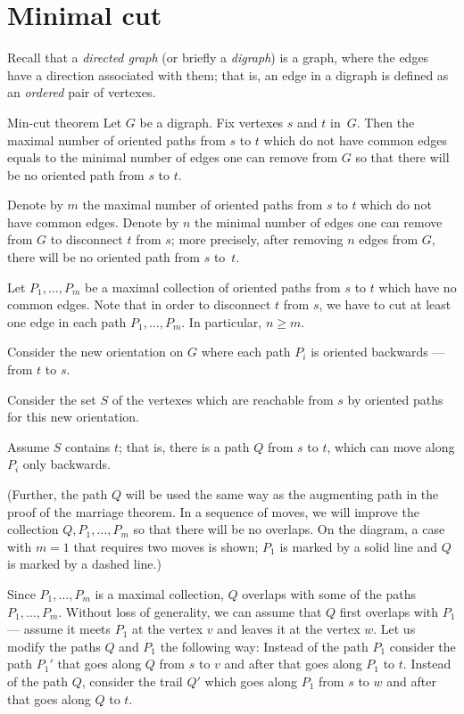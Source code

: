 \section*{Minimal cut}

Recall that a \emph{directed graph} (or briefly a \emph{digraph})
is a graph, where the edges have a direction associated with them;
that is, an edge in a digraph is defined as an {}\emph{ordered} pair of vertexes.

\begin{thm}{Min-cut theorem}
Let $G$ be a digraph. 
Fix vertexes $s$ and $t$ in~$G$.
Then the maximal number of oriented paths from $s$ to $t$ which do not have common edges equals to the minimal number of edges one can remove from $G$ so that there will be no oriented path from $s$ to $t$.
\end{thm}

Denote by $m$ the maximal number of oriented paths from $s$ to $t$ which do not have common edges.
Denote by $n$ the minimal number of edges one can remove from $G$ to disconnect $t$ from $s$; more precisely, after removing $n$ edges from $G$, there will be no oriented path from $s$ to~$t$.

Let $P_1, \dots, P_m$ be a maximal collection of oriented paths from $s$ to $t$ which have no common edges.
Note that in order to disconnect $t$ from $s$, we have to cut at least one edge in each path $P_1, \dots, P_m$.
In particular, $n\ge m$.

Consider the new orientation on $G$ where each path $P_i$ is oriented backwards --- from $t$ to $s$.

Consider the set $S$ of the vertexes which are reachable from $s$ by oriented paths for this new orientation.

Assume $S$ contains $t$; that is, there is a path $Q$ from $s$ to $t$, which
can move along $P_i$ only backwards.


(Further, the path $Q$ will be used the same way as the augmenting path in the proof of the marriage theorem.
In a sequence of moves, we will improve the collection $Q,P_1,\dots,P_m$ so that there will be no overlaps.
On the diagram, a case with $m=1$ that requires two moves is shown;
$P_1$ is marked by a solid line and $Q$ is marked by a dashed line.)

Since $P_1,\dots,P_m$ is a maximal collection, $Q$ overlaps with some of the paths $P_1,\dots,P_m$.
Without loss of generality, we can assume that $Q$ first overlaps with $P_1$ --- assume it meets $P_1$ at the vertex $v$ and leaves it at the vertex $w$.
Let us modify the paths $Q$ and $P_1$ the following way:
Instead of the path $P_1$ consider the path $P_1'$ that goes along $Q$ from $s$ to $v$ and after that goes along $P_1$ to $t$.
Instead of the path $Q$, consider the trail $Q'$ which goes along $P_1$ from $s$ to $w$ and after that goes along $Q$ to $t$.


